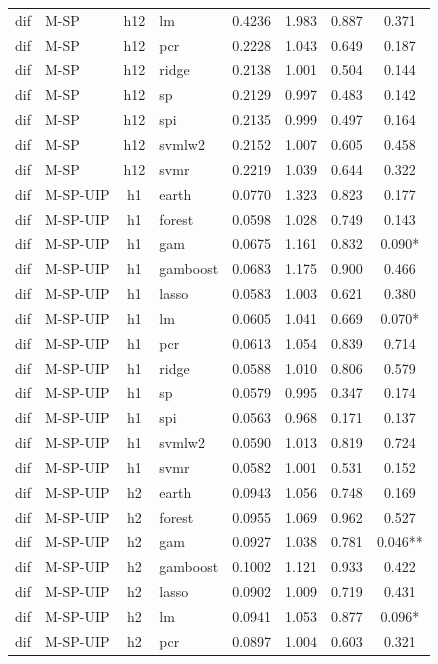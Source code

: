 \begin{ThreePartTable}
\begin{longtable}[t]{llclcccc}
dif & M-SP & h12 & lm & 0.4236 & 1.983 & 0.887 & 0.371\\
dif & M-SP & h12 & pcr & 0.2228 & 1.043 & 0.649 & 0.187\\
dif & M-SP & h12 & ridge & 0.2138 & 1.001 & 0.504 & 0.144\\
dif & M-SP & h12 & sp & 0.2129 & 0.997 & 0.483 & 0.142\\
dif & M-SP & h12 & spi & 0.2135 & 0.999 & 0.497 & 0.164\\
dif & M-SP & h12 & svmlw2 & 0.2152 & 1.007 & 0.605 & 0.458\\
dif & M-SP & h12 & svmr & 0.2219 & 1.039 & 0.644 & 0.322\\
\addlinespace
dif & M-SP-UIP & h1 & earth & 0.0770 & 1.323 & 0.823 & 0.177\\
dif & M-SP-UIP & h1 & forest & 0.0598 & 1.028 & 0.749 & 0.143\\
dif & M-SP-UIP & h1 & gam & 0.0675 & 1.161 & 0.832 & 0.090*\\
dif & M-SP-UIP & h1 & gamboost & 0.0683 & 1.175 & 0.900 & 0.466\\
dif & M-SP-UIP & h1 & lasso & 0.0583 & 1.003 & 0.621 & 0.380\\
dif & M-SP-UIP & h1 & lm & 0.0605 & 1.041 & 0.669 & 0.070*\\
dif & M-SP-UIP & h1 & pcr & 0.0613 & 1.054 & 0.839 & 0.714\\
dif & M-SP-UIP & h1 & ridge & 0.0588 & 1.010 & 0.806 & 0.579\\
dif & M-SP-UIP & h1 & sp & 0.0579 & 0.995 & 0.347 & 0.174\\
dif & M-SP-UIP & h1 & spi & 0.0563 & 0.968 & 0.171 & 0.137\\
dif & M-SP-UIP & h1 & svmlw2 & 0.0590 & 1.013 & 0.819 & 0.724\\
dif & M-SP-UIP & h1 & svmr & 0.0582 & 1.001 & 0.531 & 0.152\\
\addlinespace
dif & M-SP-UIP & h2 & earth & 0.0943 & 1.056 & 0.748 & 0.169\\
dif & M-SP-UIP & h2 & forest & 0.0955 & 1.069 & 0.962 & 0.527\\
dif & M-SP-UIP & h2 & gam & 0.0927 & 1.038 & 0.781 & 0.046**\\
dif & M-SP-UIP & h2 & gamboost & 0.1002 & 1.121 & 0.933 & 0.422\\
dif & M-SP-UIP & h2 & lasso & 0.0902 & 1.009 & 0.719 & 0.431\\
dif & M-SP-UIP & h2 & lm & 0.0941 & 1.053 & 0.877 & 0.096*\\
dif & M-SP-UIP & h2 & pcr & 0.0897 & 1.004 & 0.603 & 0.321\\

\end{longtable}
\end{ThreePartTable}
